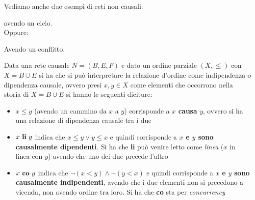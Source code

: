 \documentclass[a4paper,12pt, oneside]{book}
\begin{document}
\begin{esempio}
  Vediamo anche due esempi di reti non causali:
  \begin{figure}[H]
    \centering
  \end{figure}
  avendo un ciclo.\\
  Oppure:
  \begin{figure}[H]
    \centering
  \end{figure}
  Avendo un conflitto.
\end{esempio}
\begin{definizione}
  Data una rete causale $N=(B,E,F)$ e dato un ordine parziale $(X, \leq)$ con
  $X=B\cup E$ si ha che si può interpretare la relazione d'ordine come
  indipendenza o dipendenza causale, ovvero presi $x,y\in X$ come elementi che
  occorrono nella storia di $X=B\cup E$ si hanno le seguenti diciture:
  \begin{itemize}
    \item $x\leq y$ (avendo un cammino da $x$ a $y$) corrisponde a \textbf{$x$
      causa $y$}, ovvero si ha una relazione di dipendenza causale tra i due
    \item $x \mbox{ \textbf{li} }y$ indica che $x\leq y\lor y\leq x$ e quindi
    corrisponde a \textbf{$x$ e $y$ sono causalmente dipendenti}. Si ha che
    \textbf{li} può venire letto come \textit{linea} ($x$ in linea con $y$) 
    avendo che uno dei due precede l'altro
    \item $x \mbox{ \textbf{co} }y$ indica che $\neg(x< y)\land \neg(y < x)$ e
    quindi corrisponde a \textbf{$x$ e $y$ sono causalmente indipendenti},
    avendo che i due elementi non si precedono a vicenda, non avendo ordine tra
    loro. Si ha che \textbf{co} sta per \textit{concurrency}
  \end{itemize}
\end{definizione}
\end{document}
